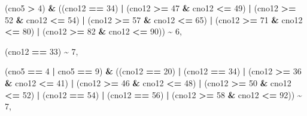 \documentclass[
]{article}
\newenvironment{Shaded}{\begin{snugshade}}{\end{snugshade}}
\newcommand{\DecValTok}[1]{\textcolor[rgb]{0.00,0.00,0.81}{#1}}
\newcommand{\NormalTok}[1]{#1}
\newcommand{\SpecialCharTok}[1]{\textcolor[rgb]{0.81,0.36,0.00}{\textbf{#1}}}
\begin{document}
\begin{Shaded}
\begin{Highlighting}[]
\NormalTok{                        (cno5 }\SpecialCharTok{\textgreater{}} \DecValTok{4}\NormalTok{) }\SpecialCharTok{\&}\NormalTok{ ((cno12 }\SpecialCharTok{==} \DecValTok{34}\NormalTok{) }\SpecialCharTok{|}\NormalTok{ (cno12 }\SpecialCharTok{\textgreater{}=} \DecValTok{47} \SpecialCharTok{\&}\NormalTok{ cno12 }\SpecialCharTok{\textless{}=} \DecValTok{49}\NormalTok{) }\SpecialCharTok{|}\NormalTok{ (cno12 }\SpecialCharTok{\textgreater{}=} \DecValTok{52} \SpecialCharTok{\&}\NormalTok{ cno12 }\SpecialCharTok{\textless{}=} \DecValTok{54}\NormalTok{) }\SpecialCharTok{|}\NormalTok{ (cno12 }\SpecialCharTok{\textgreater{}=} \DecValTok{57} \SpecialCharTok{\&}\NormalTok{ cno12 }\SpecialCharTok{\textless{}=} \DecValTok{65}\NormalTok{) }\SpecialCharTok{|}\NormalTok{ (cno12 }\SpecialCharTok{\textgreater{}=} \DecValTok{71} \SpecialCharTok{\&}\NormalTok{ cno12 }\SpecialCharTok{\textless{}=} \DecValTok{80}\NormalTok{) }\SpecialCharTok{|}\NormalTok{ (cno12 }\SpecialCharTok{\textgreater{}=} \DecValTok{82} \SpecialCharTok{\&}\NormalTok{ cno12 }\SpecialCharTok{\textless{}=} \DecValTok{90}\NormalTok{)) }\SpecialCharTok{\textasciitilde{}} \DecValTok{6}\NormalTok{,}
                        
\NormalTok{                        (cno12 }\SpecialCharTok{==} \DecValTok{33}\NormalTok{)   }\SpecialCharTok{\textasciitilde{}} \DecValTok{7}\NormalTok{,}
                        
\NormalTok{                        (cno5 }\SpecialCharTok{==} \DecValTok{4} \SpecialCharTok{|}\NormalTok{ cno5 }\SpecialCharTok{==} \DecValTok{9}\NormalTok{) }\SpecialCharTok{\&}\NormalTok{ ((cno12 }\SpecialCharTok{==} \DecValTok{20}\NormalTok{) }\SpecialCharTok{|}\NormalTok{ (cno12 }\SpecialCharTok{==} \DecValTok{34}\NormalTok{) }\SpecialCharTok{|} 
\NormalTok{                        (cno12 }\SpecialCharTok{\textgreater{}=} \DecValTok{36} \SpecialCharTok{\&}\NormalTok{ cno12 }\SpecialCharTok{\textless{}=} \DecValTok{41}\NormalTok{) }\SpecialCharTok{|}\NormalTok{ (cno12 }\SpecialCharTok{\textgreater{}=} \DecValTok{46} \SpecialCharTok{\&}\NormalTok{ cno12 }\SpecialCharTok{\textless{}=} \DecValTok{48}\NormalTok{) }\SpecialCharTok{|}
\NormalTok{                        (cno12 }\SpecialCharTok{\textgreater{}=} \DecValTok{50} \SpecialCharTok{\&}\NormalTok{ cno12 }\SpecialCharTok{\textless{}=} \DecValTok{52}\NormalTok{) }\SpecialCharTok{|}\NormalTok{ (cno12 }\SpecialCharTok{==} \DecValTok{54}\NormalTok{) }\SpecialCharTok{|}\NormalTok{ (cno12 }\SpecialCharTok{==} \DecValTok{56}\NormalTok{) }\SpecialCharTok{|} 
\NormalTok{                        (cno12 }\SpecialCharTok{\textgreater{}=} \DecValTok{58} \SpecialCharTok{\&}\NormalTok{ cno12 }\SpecialCharTok{\textless{}=} \DecValTok{92}\NormalTok{)) }\SpecialCharTok{\textasciitilde{}} \DecValTok{7}\NormalTok{,}
                        

\end{Highlighting}
\end{Shaded}
\end{document}
